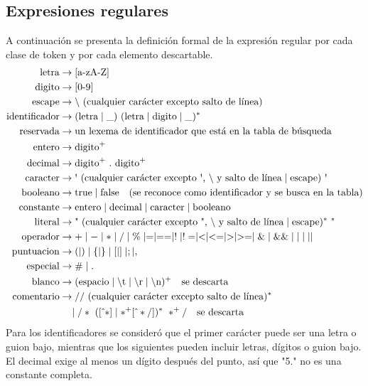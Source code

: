 \documentclass[12pt,letterpaper]{article}
\begin{document}
\subsection{Expresiones regulares}
A continuación se presenta la definición formal de la expresión regular por cada clase de token y por cada elemento descartable.
\begin{align*}
\text{letra} &\rightarrow [\text{a-zA-Z}] \\
\text{digito} &\rightarrow [0\text{-}9] \\
\text{escape} &\rightarrow \backslash\ (\text{cualquier carácter excepto salto de línea}) \\
\text{identificador} &\rightarrow (\text{letra} \mid \text{\_})\ (\text{letra} \mid \text{digito} \mid \text{\_})^* \\
\text{reservada} &\rightarrow \text{un lexema de identificador que está en la tabla de búsqueda} \\
\text{entero} &\rightarrow \text{digito}^+ \\
\text{decimal} &\rightarrow \text{digito}^+\ .\ \text{digito}^+ \\
\text{caracter} &\rightarrow \text{\textquotesingle}\ (\text{cualquier carácter excepto \textquotesingle, } \backslash \text{ y salto de línea} \mid \text{escape})\ \text{\textquotesingle} \\
\text{booleano} &\rightarrow \text{true} \mid \text{false} \quad \text{(se reconoce como identificador y se busca en la tabla)} \\
\text{constante} &\rightarrow \text{entero} \mid \text{decimal} \mid \text{caracter} \mid \text{booleano} \\
\text{literal} &\rightarrow \text{\textquotedbl}\ (\text{cualquier carácter excepto \textquotedbl, } \backslash \text{ y salto de línea} \mid \text{escape})^*\ \text{\textquotedbl} \\
\text{operador} &\rightarrow + \mid - \mid * \mid / \mid \% \mid = \mid == \mid ! \mid != \mid < \mid <= \mid > \mid >= \mid \& \mid \&\& \mid \text{\textbar} \mid \text{\textbar\textbar} \\
\text{puntuacion} &\rightarrow ( \mid ) \mid \{ \mid \} \mid [ \mid ] \mid ; \mid , \\
\text{especial} &\rightarrow \# \mid . \\
\text{blanco} &\rightarrow (\text{espacio} \mid \backslash\text{t} \mid \backslash\text{r} \mid \backslash\text{n})^+ \quad \text{se descarta} \\
\text{comentario} &\rightarrow // \ (\text{cualquier carácter excepto salto de línea})^* \\
&\quad \mid /* \ ([\hat{\ }*] \mid *^+ [\hat{\ }*/])^* \ *^+ / \quad \text{se descarta}
\end{align*}
\newpage
Para los identificadores se consideró que el primer carácter puede ser una letra o guion bajo, mientras que los siguientes pueden incluir letras, dígitos o guion bajo. El decimal exige al menos un dígito después del punto, así que "5." no es una constante completa.
\end{document}
